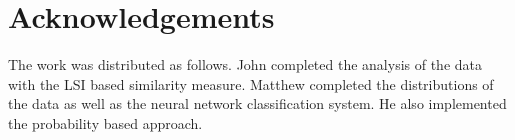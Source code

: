 \section{Acknowledgements}

The work was distributed as follows. John completed the analysis of the data with the LSI based similarity measure.
Matthew completed the distributions of the data as well as the neural network classification system. He also implemented the probability based approach.

